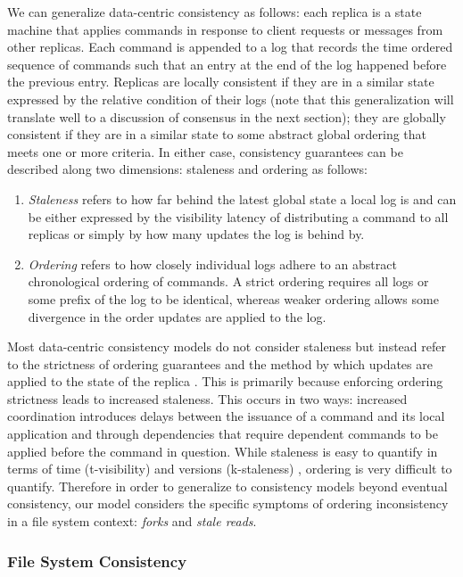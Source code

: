 \documentclass{article}
\begin{document}
We can generalize data-centric consistency as follows: each replica is a state machine that applies commands in response to client requests or messages from other replicas. Each command is appended to a log that records the time ordered sequence of commands such that an entry at the end of the log happened before the previous entry. Replicas are locally consistent if they are in a similar state expressed by the relative condition of their logs (note that this generalization will translate well to a discussion of consensus in the next section); they are globally consistent if they are in a similar state to some abstract global ordering that meets one or more criteria. In either case, consistency guarantees can be described along two dimensions: staleness and ordering as follows:

\begin{enumerate}
    \item \textit{Staleness} refers to how far behind the latest global state a local log is and can be either expressed by the visibility latency of distributing a command to all replicas or simply by how many updates the log is behind by.
    \item \textit{Ordering} refers to how closely individual logs adhere to an abstract chronological ordering of commands. A strict ordering requires all logs or some prefix of the log to be identical, whereas weaker ordering allows some divergence in the order updates are applied to the log.
\end{enumerate}

Most data-centric consistency models do not consider staleness but instead refer to the strictness of ordering guarantees and the method by which updates are applied to the state of the replica \cite{tanenbaum_distributed_2007}. This is primarily because enforcing ordering strictness leads to increased staleness. This occurs in two ways: increased coordination introduces delays between the issuance of a command and its local application and through dependencies that require dependent commands to be applied before the command in question. While staleness is easy to quantify in terms of time (t-visibility) and versions (k-staleness) \cite{bailis_quantifying_2014}, ordering is very difficult to quantify. Therefore in order to generalize to consistency models beyond eventual consistency, our model considers the specific symptoms of ordering inconsistency in a file system context: \textit{forks} and \textit{stale reads}.

\subsubsection{File System Consistency}
\end{document}
